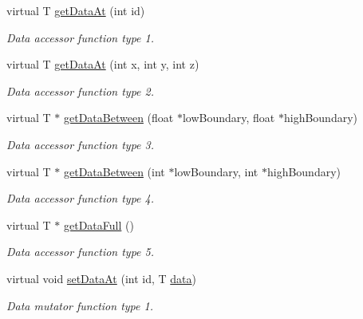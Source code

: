 \begin{DoxyCompactItemize}
virtual T \hyperlink{classITL__field__regular_a78f814d7617aeb01c63def2f5f2e9caa}{getDataAt} (int id)
\begin{DoxyCompactList}\small\item\em Data accessor function type 1. \item\end{DoxyCompactList}\item 
virtual T \hyperlink{classITL__field__regular_ad05668c219a4632a3ceaca8409339103}{getDataAt} (int x, int y, int z)
\begin{DoxyCompactList}\small\item\em Data accessor function type 2. \item\end{DoxyCompactList}\item 
virtual T $\ast$ \hyperlink{classITL__field__regular_a13a2ec8f1e67b6a906d1799a58acf9bd}{getDataBetween} (float $\ast$lowBoundary, float $\ast$highBoundary)
\begin{DoxyCompactList}\small\item\em Data accessor function type 3. \item\end{DoxyCompactList}\item 
virtual T $\ast$ \hyperlink{classITL__field__regular_af0d8776246431db1f5069f2ce6eb4d2f}{getDataBetween} (int $\ast$lowBoundary, int $\ast$highBoundary)
\begin{DoxyCompactList}\small\item\em Data accessor function type 4. \item\end{DoxyCompactList}\item 
virtual T $\ast$ \hyperlink{classITL__field__regular_ac1e68a90b1eb23279aa18e5827102b2e}{getDataFull} ()
\begin{DoxyCompactList}\small\item\em Data accessor function type 5. \item\end{DoxyCompactList}\item 
virtual void \hyperlink{classITL__field__regular_a201a4f3e6b1a0ff6654f2bfbb40f516d}{setDataAt} (int id, T \hyperlink{MainIT__regvector_8cpp_a783b2b1c03f80ec0d3ed965238d6bd65}{data})
\begin{DoxyCompactList}\small\item\em Data mutator function type 1. \item\end{DoxyCompactList}\item 

\end{DoxyCompactItemize}
